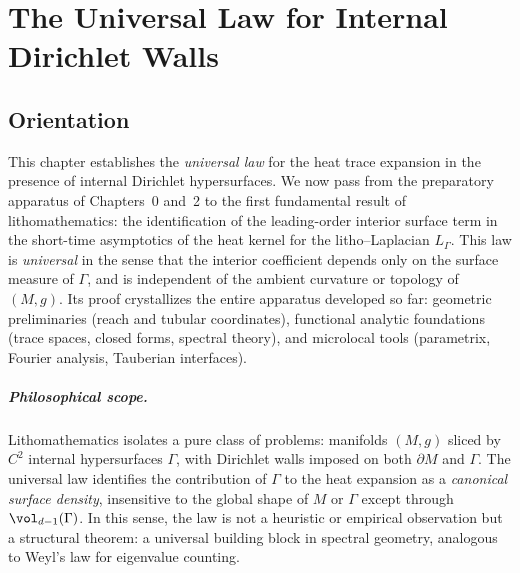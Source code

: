 
\chapter{The Universal Law for Internal Dirichlet Walls}
\label{chap:universal-law}

\section*{Orientation}
This chapter establishes the \emph{universal law} for the heat trace expansion in the presence of internal Dirichlet hypersurfaces.
We now pass from the preparatory apparatus of Chapters~0 and~2 to the first fundamental result of lithomathematics:
the identification of the leading-order interior surface term in the short-time asymptotics of the heat kernel
for the litho--Laplacian $L_\Gamma$.
This law is \emph{universal} in the sense that the interior coefficient depends only on the surface measure of $\Gamma$,
and is independent of the ambient curvature or topology of $(M,g)$.
Its proof crystallizes the entire apparatus developed so far: geometric preliminaries (reach and tubular coordinates),
functional analytic foundations (trace spaces, closed forms, spectral theory),
and microlocal tools (parametrix, Fourier analysis, Tauberian interfaces).

\bigskip

\paragraph{Philosophical scope.}
Lithomathematics isolates a pure class of problems: manifolds $(M,g)$ sliced by $C^2$ internal hypersurfaces $\Gamma$,
with Dirichlet walls imposed on both $\partial M$ and $\Gamma$.
The universal law identifies the contribution of $\Gamma$ to the heat expansion as a \emph{canonical surface density},
insensitive to the global shape of $M$ or $\Gamma$ except through $\vol_{d-1}(\Gamma)$.
In this sense, the law is not a heuristic or empirical observation but a structural theorem:
a universal building block in spectral geometry, analogous to Weyl’s law for eigenvalue counting.

